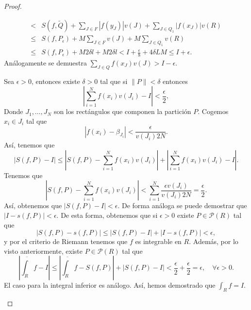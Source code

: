 \begin{proof}
\begin{description}
\[\begin{split}
	< & S\left(f,\tilde{Q}\right)+\sum^{}_{J \in F} \left|f\left(y_{J}\right)\right|v\left(J\right)+\sum^{}_{J \in Q_{1}} \left|f\left(x_{J}\right)\right|v\left(R\right)\\
	\leq & S\left(f,P_{\epsilon }\right)+M\sum^{}_{J \in F}v\left(J\right)+M\sum^{}_{J \in Q_{1}}v\left(R\right)\\
	\leq & S\left(f,P_{\epsilon }\right)+M2\delta l+M2\delta l < I + \frac{\epsilon }{8}+4\delta LM
	\leq  I + \epsilon .
\end{split}
\]
Análogamente se demuestra $\displaystyle \sum^{}_{J \in Q}f\left(x_{J}\right)v\left(J\right)> I - \epsilon  $. 
\item[(ii)] Sea $\displaystyle \epsilon > 0 $, entonces existe $\displaystyle \delta > 0 $ tal que si $\displaystyle \|P\| < \delta  $ entonces
	\[ \left|\sum_{i = 1}^{N}f\left(x_{i}\right)v\left(J_{i}\right) - I\right| < \frac{\epsilon }{2} ,\]
Donde $\displaystyle J_{1}, \ldots, J_{N} $ son los rectángulos que componen la partición $\displaystyle P $. Cogemos $\displaystyle x_{i} \in J_{i} $ tal que 
	\[ \left|f\left(x_i\right)-\beta_{J_{i}}\right| < \frac{\epsilon }{v\left(J_{i}\right)2N} .\]
Así, tenemos que 
\[ \left|S\left(f,P\right)-I\right| \leq \left|S\left(f,P\right)-\sum^{N}_{i = 1}f\left(x_{i}\right)v\left(J_{i}\right)\right| + \left|\sum^{N}_{i = 1}f\left(x_{i}\right)v\left(J_{i}\right)-I\right| .\]
Tenemos que 
\[ \left|S\left(f,P\right)-\sum^{N}_{i = 1}f\left(x_{i}\right)v\left(J_{i}\right)\right| < \sum^{N}_{i = 1}\frac{\epsilon v\left(J_{i}\right)}{v\left(J_{i}\right)2N} = \frac{\epsilon }{2} .\]
Así, obtenemos que $\displaystyle \left|S\left(f,P\right)-I\right| < \epsilon  $. De forma análoga se puede demostrar que $\displaystyle \left|I - s\left(f,P\right)\right| < \epsilon  $. De esta forma, obtenemos que si $\displaystyle \epsilon > 0 $ existe $\displaystyle P \in \mathcal{P}\left(R\right) $ tal que 
\[ \left|S\left(f,P\right)-s\left(f,P\right)\right| \leq \left|S\left(f,P\right)-I\right|+ \left|I -s\left(f,P\right)\right| < \epsilon ,\]
y por el criterio de Riemann tenemos que $\displaystyle f $ es integrable en $\displaystyle R $. Además, por lo visto anteriormente, existe $\displaystyle P \in \mathcal{P}\left(R\right) $ tal que 
\[ \left|\overline{\int_{R}}f - I\right|\leq \left|\overline{\int _{R} }f - S\left(f,P\right)\right| + \left|S\left(f,P\right)-I\right| < \frac{\epsilon }{2} + \frac{\epsilon }{2} = \epsilon , \quad \forall \epsilon > 0  .\]
El caso para la integral inferior es análogo. Así, hemos demostrado que $\displaystyle \int _{R}f = I $. 
\end{description}
\end{proof}
